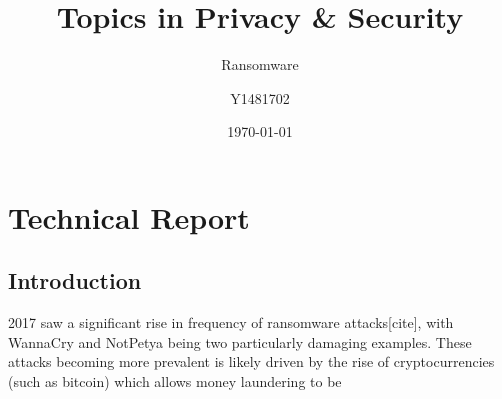 \documentclass{article}
\title{Topics in Privacy \& Security}
\subtitle{Ransomware}
\author{Y1481702}
\date{\today}
\begin{document}
\begin{titlepage}
\maketitle
\tableofcontents
\end{titlepage}



\section{Technical Report}%
\subsection{Introduction}

2017 saw a significant rise in frequency of ransomware attacks[cite], with WannaCry\cite{wannacry_reuters, wannacry_bbc} and NotPetya\cite{petya_independent} being two particularly damaging examples.
These attacks becoming more prevalent is likely driven by the rise of cryptocurrencies (such as bitcoin) which allows money laundering to be %
\end{document}
